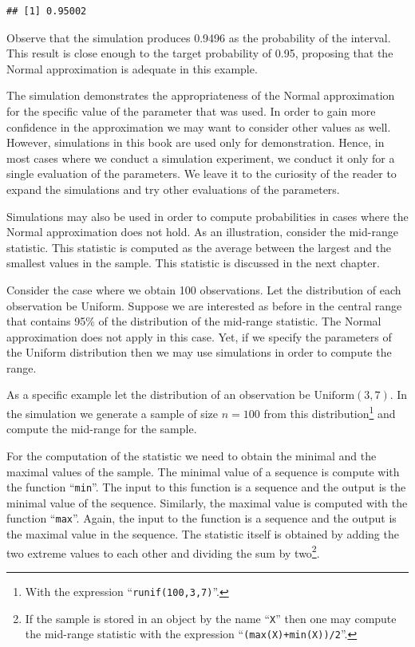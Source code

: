 \documentclass[
]{krantz}
\theoremstyle{definition}
\theoremstyle{definition}
\theoremstyle{definition}
\theoremstyle{remark}
\begin{document}
\begin{verbatim}
## [1] 0.95002
\end{verbatim}

Observe that the simulation produces 0.9496 as the probability of the
interval. This result is close enough to the target probability of 0.95,
proposing that the Normal approximation is adequate in this example.

The simulation demonstrates the appropriateness of the Normal
approximation for the specific value of the parameter that was used. In
order to gain more confidence in the approximation we may want to
consider other values as well. However, simulations in this book are
used only for demonstration. Hence, in most cases where we conduct a
simulation experiment, we conduct it only for a single evaluation of the
parameters. We leave it to the curiosity of the reader to expand the
simulations and try other evaluations of the parameters.

Simulations may also be used in order to compute probabilities in cases
where the Normal approximation does not hold. As an illustration,
consider the mid-range statistic. This statistic is computed as the
average between the largest and the smallest values in the sample. This
statistic is discussed in the next chapter.

Consider the case where we obtain 100 observations. Let the distribution
of each observation be Uniform. Suppose we are interested as before in
the central range that contains 95\% of the distribution of the mid-range
statistic. The Normal approximation does not apply in this case. Yet, if
we specify the parameters of the Uniform distribution then we may use
simulations in order to compute the range.

As a specific example let the distribution of an observation be
\(\mathrm{Uniform}(3,7)\). In the simulation we generate a sample of size
\(n=100\) from this distribution\footnote{With the expression ``\texttt{runif(100,3,7)}''.} and compute the mid-range for the
sample.

For the computation of the statistic we need to obtain the minimal and
the maximal values of the sample. The minimal value of a sequence is
compute with the function ``\texttt{min}''. The input to this function is a
sequence and the output is the minimal value of the sequence. Similarly,
the maximal value is computed with the function ``\texttt{max}''. Again, the
input to the function is a sequence and the output is the maximal value
in the sequence. The statistic itself is obtained by adding the two
extreme values to each other and dividing the sum by two\footnote{If the sample is stored in an object by the name ``\texttt{X}'' then one
  may compute the mid-range statistic with the expression
  ``\texttt{(max(X)+min(X))/2}''.}.
\end{document}
